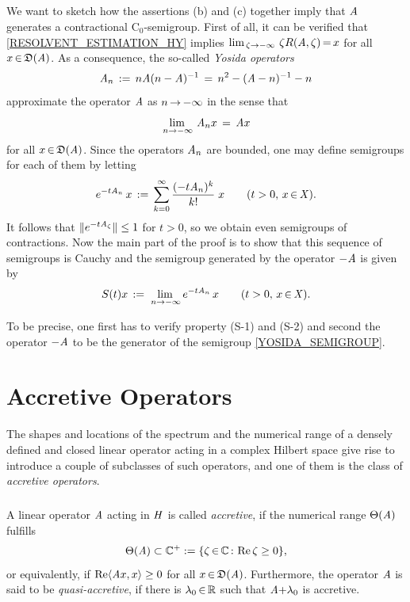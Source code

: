 \documentclass[11pt,twoside]{article}
\begin{document}
\subparagraph{} %
We want to sketch how the assertions (b) and (c) together imply
that $\-\mathit{A}$ generates a contractional C$_0$-semigroup.
First of all,
it can be verified that \eqref{RESOLVENT_ESTIMATION_HY} implies
$
\lim_{\,\zeta \to -\infty} \, \zeta R(\mathit{A},\zeta) {\,=\,} x
$
for all $x {\,\in\,} \mathfrak{D}(\mathit{A})$.
As a consequence,
the so-called \textit{Yosida operators}
\[
\mathit{A}_n \,:=\, n \mathit{A} (n-\mathit{A})^{-1} \,=\, n^2 - (\mathit{A}-n)^{-1} - n
\]
approximate the operator $\mathit{A}$ as $n {\,\to\,} {-} \infty$ in the sense that
\[
\lim_{\,n \to -\infty} \, \mathit{A}_n x \,=\, \mathit{A} x
\]
for all $x {\,\in\,} \mathfrak{D}(\mathit{A})$.
Since the operators $\mathit{A}_n$ are bounded,
one may define semigroups for each of them by letting
\[
e^{-t \mathit{A}_n}\,x \,:=\,
\sum_{k=0}^{\infty} \frac{(-t \mathit{A}_n)^k}{k!}\;x
\quad \quad (t > 0,\, x {\,\in\,} \mathit{X}).
\]
It follows that $\lVert e^{-t \mathit{A}_{\zeta}} \rVert \leq 1$ for $t > 0$,
so we obtain even semigroups of contractions.
Now the main part of the proof is to show that
this sequence of semigroups is Cauchy and
the semigroup generated by the operator $-\mathit{A}$ is given by
\begin{equation}\label{YOSIDA_SEMIGROUP}
S(t)x \,:=\, \lim_{\,n \to -\infty} e^{-t \mathit{A}_n}\,x
\quad \quad (t > 0,\, x {\,\in\,} \mathit{X}).
\end{equation}

To be precise,
one first has to verify property (S-1) and (S-2)
and second the operator ${-}\mathit{A}$ to be
the generator of the semigroup \eqref{YOSIDA_SEMIGROUP}.

\section{Accretive Operators}                                                  %
The shapes and locations 
of the spectrum and the numerical range of
a densely defined and closed linear operator
acting in a complex Hilbert space
give rise to introduce a couple of subclasses of such operators,
and one of them is the class of \textit{accretive operators}.

\subparagraph{} %
A linear operator $\mathit{A}$ acting in $\mathit{H}$ is called \textit{accretive},
if the numerical range $\Theta(\mathit{A})$ fulfills
\[
\Theta(\mathit{A}) \subset {\mathbb{C}}^+ := \{\zeta {\,\in\,} {\mathbb{C}} {\,:\,} \operatorname{Re} \zeta \geq 0\},
\]
or equivalently,
if $\operatorname{Re} \langle \mathit{A} x,x \rangle \geq 0$ for all $x {\,\in\,} \mathfrak{D}(\mathit{A})$.
Furthermore,
the operator $\mathit{A}$ is said to be \textit{quasi-accretive},
if there is $\lambda_0 {\,\in\,} {\mathbb{R}}$ such that $\mathit{A} {+}\lambda_0$ is accretive.
\end{document}
